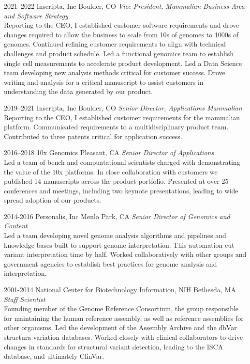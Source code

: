 \documentclass[]{dmc-cv} %
\begin{document}
\begin{entrylist}
\entry
{2021--2022}
{Inscripta, Inc}
{Boulder, CO}
{\emph{Vice President, Mammalian Business Area and Software Strategy}\\
Reporting to the CEO, I established customer software requirements and drove changes required to allow the business to scale from 10s of genomes to 1000s of genomes. 
Continued refining customer requirements to align with technical challenges and product schedule. 
Led a functional genomics team to establish single cell measurements to accelerate product development. 
Led a Data Science team developing new analysis methods critical for customer success. 
Drove writing and analysis for a critical manuscript to assist customers in understanding the data generated by our product.
}

\entry
{2019--2021}
{Inscripta, Inc}
{Boulder, CO}
{\emph{Senior Director, Applications Mammalian}\\
Reporting to the CEO, I established customer requirements for the mammalian platform. Communicated requirements to a multidisciplinary product team. 
Contributed to three patents critical for application success.
}

\entry
{2016--2018}
{10x Genomics}
{Pleasant, CA}
{\emph{Senior Director of Applications} \\
Led a team of bench and compuatational scientists charged with demonstrating the value of the 10x platforms. In close collaboration with customers we published 14 manuscripts across 
the product portfolio. Presented at over 25 conferences and meetings, including two keynote presentations, leading to wide spread adoption of our products. 
}

\entry
{2014-2016}
{Personalis, Inc}
{Menlo Park, CA}
{\emph{Senior Director of Genomics and Content} \\
Led a team developing novel genome analysis algorithms and pipelines and knowledge bases built to support genome interpretation. This automation cut variant interpretation time by half. 
Worked collaboratively with other groups and government agencies to establish best practices for genome analysis and interpretation. 
}

\entry
{2001-2014}
{National Center for Biotechnology Information, NIH}
{Bethesda, MA}
{\emph{Staff Scientist} \\
Founding member of the Genome Reference Consortium, the group responsible for maintaining the human reference assembly, as well as reference assemblies for other organisms. 
Led the development of the Assembly Archive and the dbVar structura variation databases. 
Worked closely with clinical collaborators to drive changes in standards for structural variant detection, leading to the ISCA database, and ultimately ClinVar. 
}

\end{entrylist}
\end{document}
